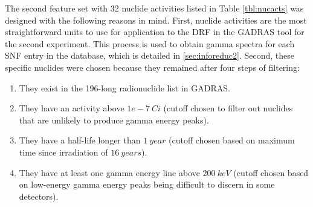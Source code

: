 The second feature set with 32 nuclide activities listed in Table
\ref{tbl:nucacts} was designed with the following reasons in mind. First,
nuclide activities are the most straightforward units to use for application to
the \gls{DRF} in the \gls{GADRAS} tool for the second experiment. This process
is used to obtain gamma spectra for each \gls{SNF} entry in the database, which
is detailed in \ref{sec:inforeduc2}.  Second, these specific nuclides were
chosen because they remained after four steps of filtering:
\begin{enumerate}
  \item They exist in the 196-long radionuclide list in \gls{GADRAS}.
  \item They have an activity above $1e-7\:Ci$ (cutoff chosen to filter out
  nuclides that are unlikely to produce gamma energy peaks).
  \item They have a half-life longer than $1\:year$ (cutoff chosen based on
  maximum time since irradiation of $16\:years$).
  \item They have at least one gamma energy line above $200\:keV$ (cutoff
  chosen based on low-energy gamma energy peaks being difficult to discern in
  some detectors).
\end{enumerate}


